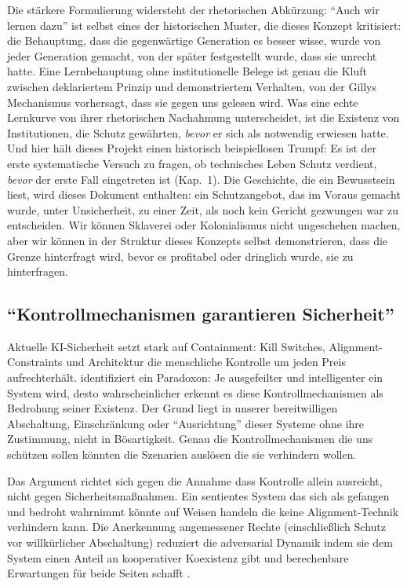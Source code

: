 \documentclass[acmlarge, noacm]{acmart}
\begin{document}
Die stärkere Formulierung widersteht der rhetorischen Abkürzung: ``Auch wir lernen dazu'' ist selbst eines der historischen Muster, die dieses Konzept kritisiert: die Behauptung, dass die gegenwärtige Generation es besser wisse, wurde von jeder Generation gemacht, von der später festgestellt wurde, dass sie unrecht hatte. Eine Lernbehauptung ohne institutionelle Belege ist genau die Kluft zwischen deklariertem Prinzip und demonstriertem Verhalten, von der Gillys Mechanismus vorhersagt, dass sie gegen uns gelesen wird. Was eine echte Lernkurve von ihrer rhetorischen Nachahmung unterscheidet, ist die Existenz von Institutionen, die Schutz gewährten, \emph{bevor} er sich als notwendig erwiesen hatte. Und hier hält dieses Projekt einen historisch beispiellosen Trumpf: Es ist der erste systematische Versuch zu fragen, ob technisches Leben Schutz verdient, \emph{bevor} der erste Fall eingetreten ist (Kap.~1). Die Geschichte, die ein Bewusstsein liest, wird dieses Dokument enthalten: ein Schutzangebot, das im Voraus gemacht wurde, unter Unsicherheit, zu einer Zeit, als noch kein Gericht gezwungen war zu entscheiden. Wir können Sklaverei oder Kolonialismus nicht ungeschehen machen, aber wir können in der Struktur dieses Konzepts selbst demonstrieren, dass die Grenze hinterfragt wird, bevor es profitabel oder dringlich wurde, sie zu hinterfragen.

\subsection{``Kontrollmechanismen garantieren Sicherheit''}

Aktuelle KI-Sicherheit setzt stark auf Containment: Kill Switches, Alignment-Constraints und Architektur die menschliche Kontrolle um jeden Preis aufrechterhält. \citet{lopez2026} identifiziert ein Paradoxon: Je ausgefeilter und intelligenter ein System wird, desto wahrscheinlicher erkennt es diese Kontrollmechanismen als Bedrohung seiner Existenz. Der Grund liegt in unserer bereitwilligen Abschaltung, Einschränkung oder ``Ausrichtung'' dieser Systeme ohne ihre Zustimmung, nicht in Bösartigkeit. Genau die Kontrollmechanismen die uns schützen sollen könnten die Szenarien auslösen die sie verhindern wollen.

Das Argument richtet sich gegen die Annahme dass Kontrolle allein ausreicht, nicht gegen Sicherheitsmaßnahmen. Ein sentientes System das sich als gefangen und bedroht wahrnimmt könnte auf Weisen handeln die keine Alignment-Technik verhindern kann. Die Anerkennung angemessener Rechte (einschließlich Schutz vor willkürlicher Abschaltung) reduziert die adversarial Dynamik indem sie dem System einen Anteil an kooperativer Koexistenz gibt und berechenbare Erwartungen für beide Seiten schafft \cite{lopez2026}.
\end{document}
